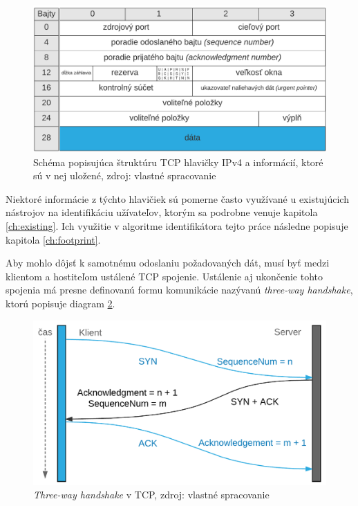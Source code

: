 \documentclass[
  printed, %
  table,   %
  lof,     %
  nolot,   %
  nocover
]{fithesis3}
\begin{document}
\begin{figure}[h]
  \centering
    \includegraphics[width=.95\textwidth]{images/net-tcp-head.png}
  \caption{Schéma popisujúca štruktúru TCP hlavičky IPv4 a informácií, ktoré sú v
  nej uložené, zdroj: vlastné spracovanie}
  \label{fig:net-tcp-head}
\end{figure}

Niektoré informácie z týchto hlavičiek sú pomerne často využívané u existujúcich
nástrojov na identifikáciu užívateľov, ktorým sa podrobne venuje kapitola
\ref{ch:existing}. Ich využitie v algoritme identifikátora tejto práce následne
popisuje kapitola \ref{ch:footprint}.

Aby mohlo dôjsť k samotnému odoslaniu požadovaných dát, musí byť medzi klientom
a hostiteľom ustálené TCP spojenie. Ustálenie aj ukončenie tohto spojenia má
presne definovanú formu komunikácie nazývanú \textit{three-way handshake}, ktorú
popisuje diagram \ref{fig:net-tcp-flow}.

\begin{figure}[h]
  \centering
    \includegraphics[width=.90\textwidth]{images/net-tcp-flow.png}
  \caption{\textit{Three-way handshake} v TCP, zdroj: vlastné spracovanie}
  \label{fig:net-tcp-flow}
\end{figure}
\end{document}
